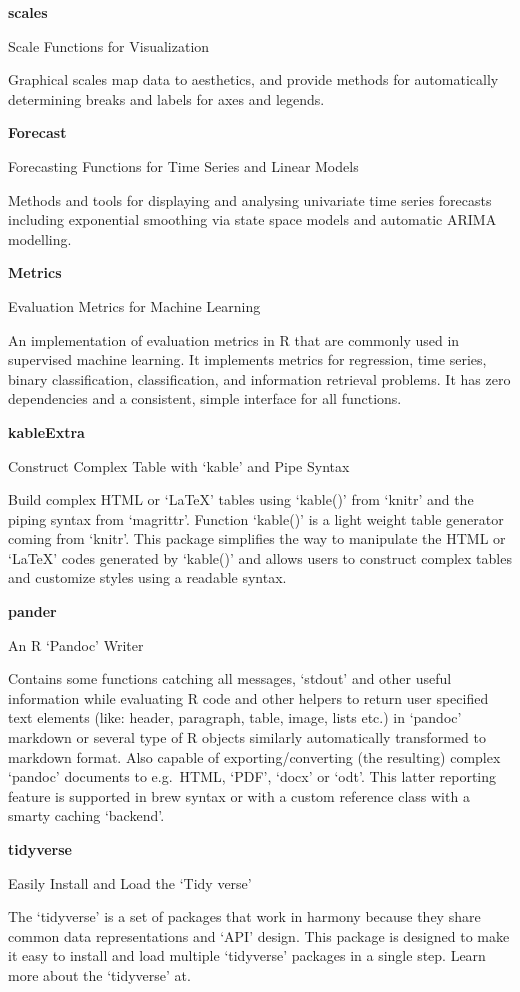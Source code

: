 \documentclass[12pt,openany]{book}
\begin{document}
\textbf{scales}

Scale Functions for Visualization

Graphical scales map data to aesthetics, and provide methods for automatically determining breaks and labels for axes and legends.

\textbf{Forecast}

Forecasting Functions for Time Series and Linear Models

Methods and tools for displaying and analysing univariate time series forecasts including exponential smoothing via state space models and automatic ARIMA modelling.

\textbf{Metrics}

Evaluation Metrics for Machine Learning

An implementation of evaluation metrics in R that are commonly used in supervised machine learning. It implements metrics for regression, time series, binary classification, classification, and information retrieval problems. It has zero dependencies and a consistent, simple interface for all functions.

\textbf{kableExtra}

Construct Complex Table with `kable' and Pipe Syntax

Build complex HTML or `LaTeX' tables using `kable()' from `knitr' and the piping syntax from `magrittr'. Function `kable()' is a light weight table generator coming from `knitr'. This package simplifies the way to manipulate the HTML or `LaTeX' codes generated by `kable()' and allows users to construct complex tables and customize styles using a readable syntax.

\textbf{pander}

An R `Pandoc' Writer

Contains some functions catching all messages, `stdout' and other useful information while evaluating R code and other helpers to return user specified text elements (like: header, paragraph, table, image, lists etc.) in `pandoc' markdown or several type of R objects similarly automatically transformed to markdown format. Also capable of exporting/converting (the resulting) complex `pandoc' documents to e.g.~HTML, `PDF', `docx' or `odt'. This latter reporting feature is supported in brew syntax or with a custom reference class with a smarty caching `backend'.

\textbf{tidyverse}

Easily Install and Load the `Tidy verse'

The `tidyverse' is a set of packages that work in harmony because they share common data representations and `API' design. This package is designed to make it easy to install and load multiple `tidyverse' packages in a single step. Learn more about the `tidyverse' at.
\end{document}
